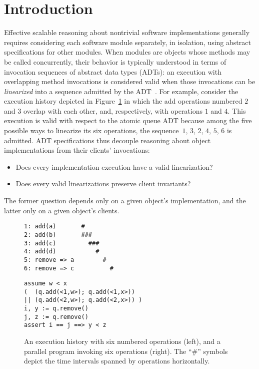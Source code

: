 \section{Introduction}
\label{sec:intro}

Effective scalable reasoning about nontrivial software implementations generally
requires considering each software module separately, in isolation, using
abstract specifications for other modules. When modules are objects whose
methods may be called concurrently, their behavior is typically understood in
terms of invocation sequences of abstract data types (ADTs): an execution with
overlapping method invocations is considered valid when those invocations can be
\emph{linearized} into a sequence admitted by the
ADT~\cite{journals/toplas/HerlihyW90}. For example, consider the execution
history depicted in Figure~\ref{fig:clients} in which the add operations
numbered $2$ and $3$ overlap with each other, and, respectively, with operations
$1$ and $4$. This execution is valid with respect to the atomic queue ADT
because among the five possible ways to linearize its six operations, the
sequence~$1$, $3$, $2$, $4$, $5$, $6$ is admitted. ADT specifications thus
decouple reasoning about object implementations from their clients’ invocations:
\begin{itemize}

  \item Does every implementation execution have a valid linearization?

  \item Does every valid linearizations preserve client invariants?

\end{itemize}
The former question depends only on a given object’s implementation, and the
latter only on a given object’s clients.

\begin{figure}[t]
  \begin{minipage}{0.43\linewidth}
    \begin{verbatim}
1: add(a)       #
2: add(b)       ###
3: add(c)         ###
4: add(d)           #
5: remove => a        #
6: remove => c          #
    \end{verbatim}
  \end{minipage}
  \hfill
  \begin{minipage}{0.55\linewidth}
    \begin{verbatim}
assume w < x
(  (q.add(<1,w>); q.add(<1,x>))
|| (q.add(<2,w>); q.add(<2,x>)) )
i, y := q.remove()
j, z := q.remove()
assert i == j ==> y < z
    \end{verbatim}
  \end{minipage}
  \caption{An execution history with six numbered operations (left),
    and a parallel program invoking six operations (right). The “\#” symbols
    depict the time intervals spanned by operations horizontally.}
  \label{fig:clients}
\end{figure}

